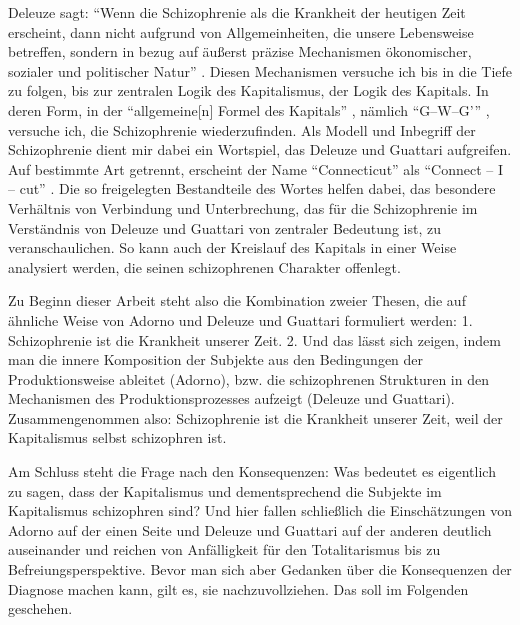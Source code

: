 \documentclass[12pt,
               paper=a4,
               twoside=false,
               onehalfspacing,
               bibliography=totoc,
               toc=graduated,
               ]{scrartcl}
\newcommand{\pc}[2]{\parencite[#1]{#2}}
\newcommand{\dg}{Deleuze und Guattari\xspace}
\begin{document}
Deleuze sagt: "`Wenn die Schizophrenie als die Krankheit der heutigen
Zeit erscheint, dann nicht aufgrund von Allgemeinheiten, die unsere
Lebensweise betreffen, sondern in bezug auf äußerst präzise
Mechanismen ökonomischer, sozialer und politischer Natur"'
\pc{28}{schizg}. Diesen Mechanismen versuche ich bis in die Tiefe zu
folgen, bis zur zentralen Logik des Kapitalismus, der Logik des
Kapitals. In deren Form, in der "`allgemeine[n] Formel des Kapitals"'
\pc{161}{kap}, nämlich "`G--W--G'"' \pc{165}{kap}, versuche ich, die
Schizophrenie wiederzufinden. Als Modell und Inbegriff der
Schizophrenie dient mir dabei ein Wortspiel, das \dg aufgreifen. Auf
bestimmte Art getrennt, erscheint der Name "`Connecticut"' als
"`Connect -- I -- cut"' \pc{48}{ao}. Die so freigelegten Bestandteile
des Wortes helfen dabei, das besondere Verhältnis von Verbindung und
Unterbrechung, das für die Schizophrenie im Verständnis von \dg von
zentraler Bedeutung ist, zu veranschaulichen. So kann auch der
Kreislauf des Kapitals in einer Weise analysiert werden, die seinen
schizophrenen Charakter offenlegt.

Zu Beginn dieser Arbeit steht also die Kombination zweier Thesen, die
auf ähnliche Weise von Adorno und \dg formuliert werden: 1.
Schizophrenie ist die Krankheit unserer Zeit. 2. Und das lässt sich
zeigen, indem man die innere Komposition der Subjekte aus den
Bedingungen der Produktionsweise ableitet (Adorno), bzw. die
schizophrenen Strukturen in den Mechanismen des Produktionsprozesses
aufzeigt (\dg). Zusammengenommen also: Schizophrenie ist die Krankheit
unserer Zeit, weil der Kapitalismus selbst schizophren ist.

Am Schluss steht die Frage nach den Konsequenzen: Was bedeutet es
eigentlich zu sagen, dass der Kapitalismus und dementsprechend die
Subjekte im Kapitalismus schizophren sind? Und hier fallen schließlich
die Einschätzungen von Adorno auf der einen Seite und \dg auf der
anderen deutlich auseinander und reichen von \glq Anfälligkeit für den
Totalitarismus\grq{} bis zu \glq Befreiungsperspektive\grq{}. Bevor
man  sich aber Gedanken über die Konsequenzen der Diagnose machen
kann, gilt es, sie nachzuvollziehen. Das soll im Folgenden geschehen.



\end{document}
